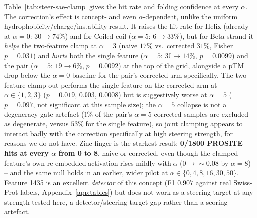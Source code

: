 \documentclass{article}
\begin{document}
Table~\ref{tab:steer-sae-clamp} gives the hit rate and folding confidence at every $\alpha$.
The correction's effect is concept- and even $\alpha$-dependent, unlike the uniform
hydrophobicity/charge/instability result. It raises the hit rate for Helix (already at
$\alpha{=}0$: $30\to74\%$) and for Coiled coil ($\alpha{=}5$: $6\to33\%$), but for Beta strand
it \emph{helps} the two-feature clamp at $\alpha{=}3$ (naive $17\%$ vs.\ corrected $31\%$,
Fisher $p{=}0.031$) and \emph{hurts} both the single feature ($\alpha{=}5$: $30\to14\%$,
$p{=}0.0099$) and the pair ($\alpha{=}5$: $19\to6\%$, $p{=}0.0092$) at the top of the grid,
alongside a pTM drop below the $\alpha{=}0$ baseline for the pair's corrected arm specifically.
The two-feature clamp out-performs the single feature on the corrected arm at
$\alpha{\in}\{1,2,3\}$ ($p{=}0.019$, $0.003$, $0.0008$) but is suggestively worse at
$\alpha{=}5$ ($p{=}0.097$, not significant at this sample size); the $\alpha{=}5$ collapse is
not a degeneracy-gate artefact ($1\%$ of the pair's $\alpha{=}5$ corrected samples are excluded
as degenerate, versus $53\%$ for the single feature), so joint clamping appears to interact
badly with the correction specifically at high steering strength, for reasons we do not have.
Zinc finger is the starkest result: \textbf{0/1800 PROSITE hits at every $\alpha$ from 0 to 8},
naive or corrected, even though the clamped feature's own re-embedded activation rises mildly
with $\alpha$ ($0\to{\sim}0.08$ by $\alpha{=}8$) -- and the same null holds in an earlier,
wider pilot at $\alpha\in\{0,4,8,16,30,50\}$. Feature 1435 is an excellent \emph{detector} of
this concept (F1 $0.907$ against real Swiss-Prot labels, Appendix~\ref{app:tables}) but does
not work as a steering target at any strength tested here, a detector/steering-target gap
rather than a scoring artefact.
\end{document}

